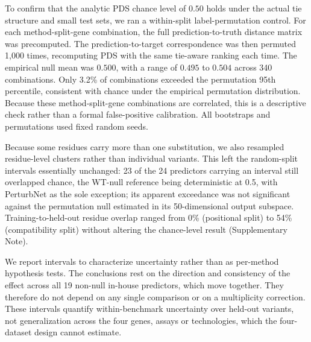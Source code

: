 \documentclass[11pt,letterpaper]{article}
\begin{document}
To confirm that the analytic PDS chance level of $0.50$ holds under the actual tie structure and small test sets, we ran a within-split label-permutation control. For each method-split-gene combination, the full prediction-to-truth distance matrix was precomputed. The prediction-to-target correspondence was then permuted 1,000 times, recomputing PDS with the same tie-aware ranking each time. The empirical null mean was $0.500$, with a range of $0.495$ to $0.504$ across 340 combinations. Only 3.2\% of combinations exceeded the permutation 95th percentile, consistent with chance under the empirical permutation distribution. Because these method-split-gene combinations are correlated, this is a descriptive check rather than a formal false-positive calibration. All bootstraps and permutations used fixed random seeds.

Because some residues carry more than one substitution, we also resampled residue-level clusters rather than individual variants. This left the random-split intervals essentially unchanged: 23 of the 24 predictors carrying an interval still overlapped chance, the WT-null reference being deterministic at 0.5, with PerturbNet as the sole exception; its apparent exceedance was not significant against the permutation null estimated in its 50-dimensional output subspace. Training-to-held-out residue overlap ranged from 0\% (positional split) to 54\% (compatibility split) without altering the chance-level result (Supplementary Note).

We report intervals to characterize uncertainty rather than as per-method hypothesis tests. The conclusions rest on the direction and consistency of the effect across all 19 non-null in-house predictors, which move together. They therefore do not depend on any single comparison or on a multiplicity correction. These intervals quantify within-benchmark uncertainty over held-out variants, not generalization across the four genes, assays or technologies, which the four-dataset design cannot estimate.
\end{document}

